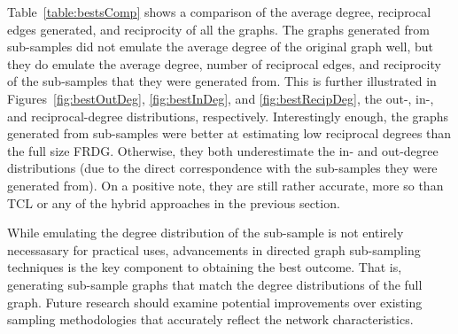 \documentclass[pdftex,11pt,a4paper,twocolumn]{scrartcl}
\begin{document}
Table~\ref{table:bestsComp} shows a comparison of the average degree, reciprocal edges generated, and reciprocity of all the graphs. The graphs generated from sub-samples did not emulate the average degree of the original graph well, but they do emulate the average degree, number of reciprocal edges, and reciprocity of the sub-samples that they were generated from. This is further illustrated in Figures~\ref{fig:bestOutDeg}, \ref{fig:bestInDeg}, and \ref{fig:bestRecipDeg}, the out-, in-, and reciprocal-degree distributions, respectively. Interestingly enough, the graphs generated from sub-samples were better at estimating low reciprocal degrees than the full size FRDG. Otherwise, they both underestimate the in- and out-degree distributions (due to the direct correspondence with the sub-samples they were generated from). On a positive note, they are still rather accurate, more so than TCL or any of the hybrid approaches in the previous section. 

While emulating the degree distribution of the sub-sample is not entirely necessasary for practical uses, advancements in directed graph sub-sampling techniques is the key component to obtaining the best outcome. That is, generating sub-sample graphs that match the degree distributions of the full graph. Future research should examine potential improvements over existing sampling methodologies that accurately reflect the network characteristics. 

\begin{table}[h]
\centering
{}
\caption{Comparison of Generated-from-Sub-Sample Graphs}
\label{table:bestsComp}
\end{table}
\end{document}
